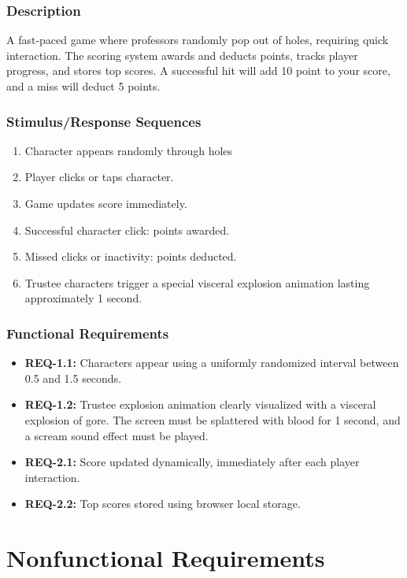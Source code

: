 \documentclass{scrreprt}
\begin{document}
\subsection{Description}
A fast-paced game where professors randomly pop out of holes, requiring quick interaction. The scoring system awards and deducts points, tracks player progress, and stores top scores. A successful hit will add 10 point to your score, and a miss will deduct 5 points.

\subsection{Stimulus/Response Sequences}
\begin{enumerate}
    \item Character appears randomly through holes
    \item Player clicks or taps character.
    \item Game updates score immediately.
    \item Successful character click: points awarded.
    \item Missed clicks or inactivity: points deducted.
    \item Trustee characters trigger a special visceral explosion animation lasting approximately 1 second.
\end{enumerate}

\subsection{Functional Requirements}
\begin{itemize}
    \item \textbf{REQ-1.1:} Characters appear using a uniformly randomized interval between 0.5 and 1.5 seconds.
    \item \textbf{REQ-1.2:} Trustee explosion animation clearly visualized with a visceral explosion of gore. The screen must be splattered with blood for 1 second, and a scream sound effect must be played.
    \item \textbf{REQ-2.1:} Score updated dynamically, immediately after each player interaction.
    \item \textbf{REQ-2.2:} Top scores stored using browser local storage.
\end{itemize}

\chapter{Nonfunctional Requirements}
\end{document}

